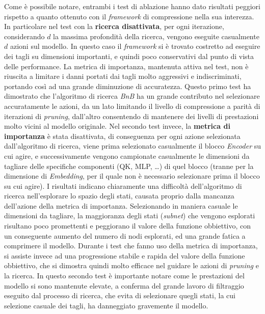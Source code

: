 Come è possibile notare, entrambi i test di ablazione hanno dato risultati peggiori rispetto a quanto ottenuto con il \textit{framework} di compressione nella sua interezza. In particolare nel test con la \textbf{ricerca disattivata}, per ogni iterazione, considerando $d$ la massima profondità della ricerca, vengono eseguite casualmente $d$ azioni sul modello. In questo caso il \textit{framework} si è trovato costretto ad eseguire dei tagli su dimensioni importanti, e quindi poco conservativi dal punto di vista delle performance. La metrica di importanza, mantenuta attiva nel test, non è riuscita a limitare i danni portati dai tagli molto aggressivi e indiscriminati, portando così ad una grande diminuzione di accuratezza. Questo primo test ha dimostrato che l'algoritmo di ricerca \textit{BnB} ha un grande contributo nel selezionare accuratamente le azioni, da un lato limitando il livello di compressione a parità di iterazioni di \textit{pruning}, dall'altro consentendo di mantenere dei livelli di prestazioni molto vicini al modello originale. \newline 
Nel secondo test invece, la \textbf{metrica di importanza} è stata disattivata, di conseguenza per ogni azione selezionata dall'algoritmo di ricerca, viene prima selezionato casualmente il blocco \textit{Encoder} su cui agire, e successivamente vengono campionate casualmente le dimensioni da tagliare delle specifiche componenti (QK, MLP, \dots) di quel blocco (tranne per la dimensione di \textit{Embedding}, per il quale non è necessario selezionare prima il blocco su cui agire). I risultati indicano chiaramente una difficoltà dell'algoritmo di ricerca nell'esplorare lo spazio degli stati, causata proprio dalla mancanza dell'azione della metrica di importanza. Selezionando in maniera casuale le dimensioni da tagliare, la maggioranza degli stati (\textit{subnet}) che vengono esplorati risultano poco promettenti e peggiorano il valore della funzione obbiettivo, con un conseguente aumento del numero di nodi esplorati, ed una grande fatica a comprimere il modello. Durante i test che fanno uso della metrica di importanza, si assiste invece ad una progressione stabile e rapida del valore della funzione obbiettivo, che si dimostra quindi molto efficace nel guidare le azioni di \textit{pruning} e la ricerca. \newline 
In questo secondo test è importante notare come le prestazioni del modello si sono mantenute elevate, a conferma del grande lavoro di filtraggio eseguito dal processo di ricerca, che evita di selezionare quegli stati, la cui selezione casuale dei tagli, ha danneggiato gravemente il modello. 


